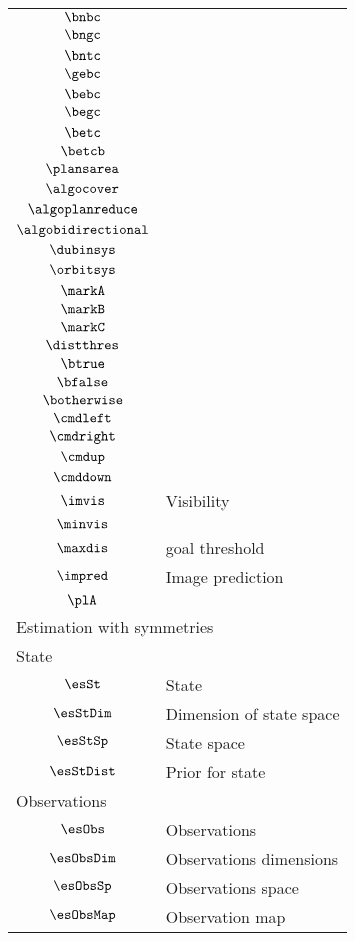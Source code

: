 \begin{longtable}{cl}
 $\bnbc$ & \\ 
 $\bngc$ & \\ 
 $\bntc$ & \\ 
 $\gebc$ & \\ 
 $\bebc$ & \\ 
 $\begc$ & \\ 
 $\betc$ & \\ 
 $\betcb$ & \\ 
 $\plansarea$ & \\ 
 $\algocover$ & \\ 
 $\algoplanreduce$ & \\ 
 $\algobidirectional$ & \\ 
 $\dubinsys$ & \\ 
 $\orbitsys$ & \\ 
 $\markA$ & \\ 
 $\markB$ & \\ 
 $\markC$ & \\ 
 $\distthres$ & \\ 
 $\btrue$ & \\ 
 $\bfalse$ & \\ 
 $\botherwise$ & \\ 
 $\cmdleft$ & \\ 
 $\cmdright$ & \\ 
 $\cmdup$ & \\ 
 $\cmddown$ & \\ 
 $\imvis$ &  Visibility\\ 
 $\minvis$ & \\ 
 $\maxdis$ &  goal threshold\\ 
 $\impred$ &  Image prediction\\ 
 $\plA$ & \\ 
 \multicolumn{2}{l}{Estimation with symmetries}\\ 
 \hline
\multicolumn{2}{l}{State}\\ 
 \hline
$\esSt$ &  State\\ 
 $\esStDim$ &  Dimension of state space\\ 
 $\esStSp$ &  State space\\ 
 $\esStDist$ &  Prior for state\\ 
 \multicolumn{2}{l}{Observations}\\ 
 \hline
$\esObs$ &  Observations\\ 
 $\esObsDim$ &  Observations dimensions\\ 
 $\esObsSp$ &  Observations space\\ 
 $\esObsMap$ &  Observation map\\ 

\end{longtable}
